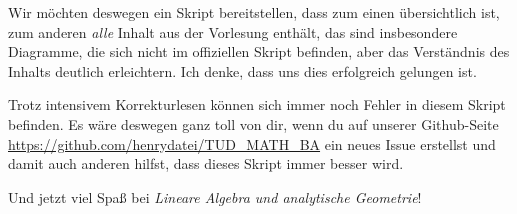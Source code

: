 Wir möchten deswegen ein Skript bereitstellen, dass zum einen übersichtlich ist, zum anderen \textit{alle} Inhalt aus der Vorlesung enthält, das sind insbesondere Diagramme, die sich nicht im offiziellen Skript befinden, aber das Verständnis des Inhalts deutlich erleichtern. Ich denke, dass uns dies erfolgreich gelungen ist.

Trotz intensivem Korrekturlesen können sich immer noch Fehler in diesem Skript befinden. Es wäre deswegen ganz toll von dir, wenn du auf unserer Github-Seite \url{https://github.com/henrydatei/TUD_MATH_BA} ein neues Issue erstellst und damit auch anderen hilfst, dass dieses Skript immer besser wird.

Und jetzt viel Spaß bei \textit{Lineare Algebra und analytische Geometrie}!